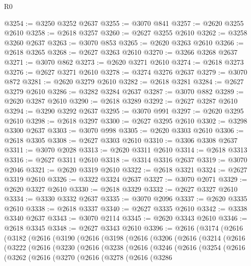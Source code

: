 \begin{lexlean}{R0}
\begin{coremodule}
@3254 := @3250 @3252 @2637
@3255 := @3070 @841
@3257 := @2620 @3255 @2610
@3258 := @2618 @3257
@3260 := @2627 @3255 @2610
@3262 := @3258 @3260 @2637
@3263 := @3070 @853
@3265 := @2620 @3263 @2610
@3266 := @2618 @3265
@3268 := @2627 @3263 @2610
@3270 := @3266 @3268 @2637
@3271 := @3070 @862
@3273 := @2620 @3271 @2610
@3274 := @2618 @3273
@3276 := @2627 @3271 @2610
@3278 := @3274 @3276 @2637
@3279 := @3070 @872
@3281 := @2620 @3279 @2610
@3282 := @2618 @3281
@3284 := @2627 @3279 @2610
@3286 := @3282 @3284 @2637
@3287 := @3070 @882
@3289 := @2620 @3287 @2610
@3290 := @2618 @3289
@3292 := @2627 @3287 @2610
@3294 := @3290 @3292 @2637
@3295 := @3070 @991
@3297 := @2620 @3295 @2610
@3298 := @2618 @3297
@3300 := @2627 @3295 @2610
@3302 := @3298 @3300 @2637
@3303 := @3070 @998
@3305 := @2620 @3303 @2610
@3306 := @2618 @3305
@3308 := @2627 @3303 @2610
@3310 := @3306 @3308 @2637
@3311 := @3070 @2028
@3313 := @2620 @3311 @2610
@3314 := @2618 @3313
@3316 := @2627 @3311 @2610
@3318 := @3314 @3316 @2637
@3319 := @3070 @2046
@3321 := @2620 @3319 @2610
@3322 := @2618 @3321
@3324 := @2627 @3319 @2610
@3326 := @3322 @3324 @2637
@3327 := @3070 @2071
@3329 := @2620 @3327 @2610
@3330 := @2618 @3329
@3332 := @2627 @3327 @2610
@3334 := @3330 @3332 @2637
@3335 := @3070 @2096
@3337 := @2620 @3335 @2610
@3338 := @2618 @3337
@3340 := @2627 @3335 @2610
@3342 := @3338 @3340 @2637
@3343 := @3070 @2114
@3345 := @2620 @3343 @2610
@3346 := @2618 @3345
@3348 := @2627 @3343 @2610
@3396 := @2616
    (@3174
      (@2616
        (@3182
          (@2616
            (@3190
              (@2616
                (@3198
                  (@2616
                    (@3206
                      (@2616
                        (@3214
                          (@2616
                            (@3222
                              (@2616
                                (@3230
                                  (@2616
                                    (@3238
                                      (@2616
                                        (@3246
                                          (@2616
                                            (@3254
                                              (@2616
                                                (@3262
                                                  (@2616
                                                    (@3270
                                                      (@2616
                                                        (@3278
                                                          (@2616
                                                            (@3286

\end{coremodule}
\end{lexlean}
